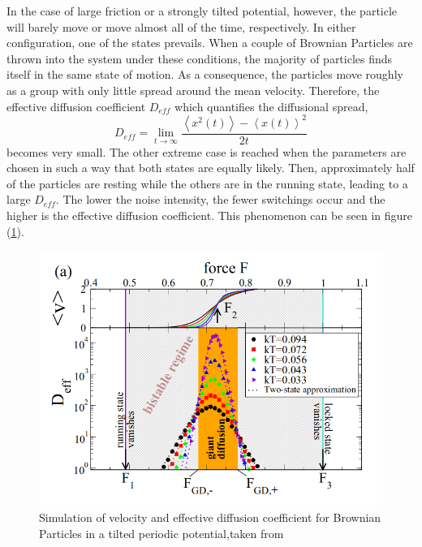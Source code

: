 \documentclass[12pt,a4paper]{article}
\begin{document}
In the case of large friction or a strongly tilted potential, however, the particle will barely move or move almost all of the time, respectively. In either configuration, one of the states prevails. When a couple of Brownian Particles are thrown into the system under these conditions, the majority of particles finds itself in the same state of motion. As a consequence, the particles move roughly as a group with only little spread around the mean velocity. Therefore, the effective diffusion coefficient $D_{eff}$ which quantifies the diffusional spread,
\begin{equation}
D_{eff}=\lim_{t\rightarrow\infty}\frac{\left\langle x^2(t) \right\rangle-\left\langle x(t)\right\rangle ^2}{2t}
\end{equation}
becomes very small. The other extreme case is reached when the parameters are chosen in such a way that both states are equally likely. Then, approximately half of the particles are resting while the others are in the running state, leading to a large $D_{eff}$. The lower the noise intensity, the fewer switchings occur and the higher is the effective diffusion coefficient. This phenomenon can be seen in figure (\ref{anbpsimintro}).

\begin{figure}[H]
	\centering
	\includegraphics[scale=0.5]{nbpsim1.png}\caption{Simulation of velocity and effective diffusion coefficient for Brownian Particles in a tilted periodic potential,taken from \cite{bpp}}
	\label{anbpsimintro}
\end{figure}
\end{document}
